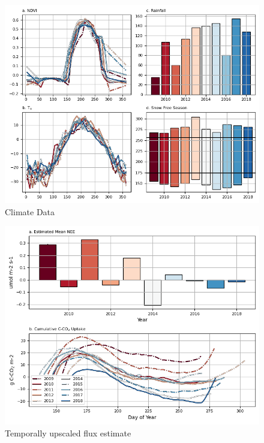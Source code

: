 \documentclass[
]{book}
\begin{document}
\begin{figure}
\centering
\includegraphics{images/16-fig4.png}
\caption{Climate Data}
\end{figure}

\begin{figure}
\centering
\includegraphics{images/16-fig5.png}
\caption{Temporally upscaled flux estimate}
\end{figure}
\end{document}
